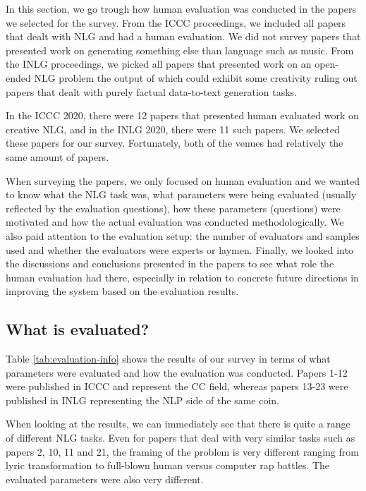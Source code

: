 \documentclass[11pt,a4paper]{article}
\begin{document}
In this section, we go trough how human evaluation was conducted in the papers we selected for the survey. From the ICCC proceedings, we included all papers that dealt with NLG and had a human evaluation. We did not survey papers that presented work on generating something else than language such as music. From the INLG proceedings, we picked all papers that presented work on an open-ended NLG problem the output of which could exhibit some creativity ruling out papers that dealt with purely factual data-to-text generation tasks.

In the ICCC 2020, there were 12 papers that presented human evaluated work on creative NLG, and in the INLG 2020, there were 11 such papers. We selected these papers for our survey. Fortunately, both of the venues had relatively the same amount of papers.

When surveying the papers, we only focused on human evaluation and we wanted to know what the NLG task was, what parameters were being evaluated (usually reflected by the evaluation questions), how these parameters (questions) were motivated and how the actual evaluation was conducted methodologically. We also paid attention to the evaluation setup: the number of evaluators and samples used and whether the evaluators were experts or laymen. Finally, we looked into the discussions and conclusions presented in the papers to see what role the human evaluation had there, especially in relation to concrete future directions in improving the system based on the evaluation results.

\subsection{What is evaluated?}

Table \ref{tab:evaluation-info} shows the results of our survey in terms of what parameters were evaluated and how the evaluation was conducted. Papers 1-12 were published in ICCC and represent the CC field, whereas papers 13-23 were published in INLG representing the NLP side of the same coin.



When looking at the results, we can immediately see that there is quite a range of different NLG tasks. Even for papers that deal with very similar tasks such as papers 2, 10, 11 and 21, the framing of the problem is very different ranging from lyric transformation to full-blown human versus computer rap battles. The evaluated parameters were also very different.
\end{document}
